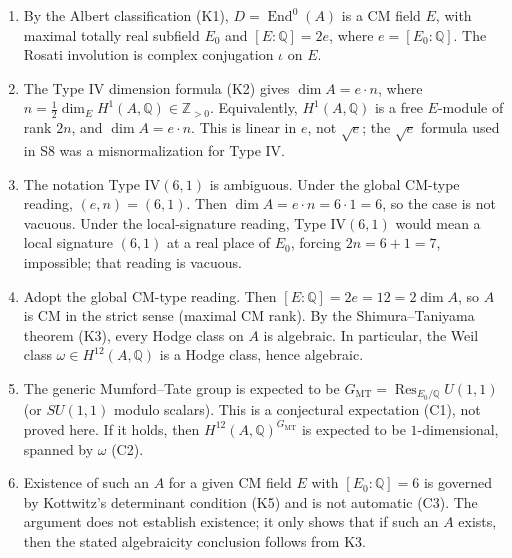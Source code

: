 \documentclass{article}
\begin{document}
\begin{enumerate}
\item By the Albert classification (K1), \(D = \operatorname{End}^0(A)\) is a CM field \(E\), with maximal totally real subfield \(E_0\) and \([E:\mathbb{Q}] = 2e\), where \(e = [E_0:\mathbb{Q}]\). The Rosati involution is complex conjugation \(\iota\) on \(E\).

\item The Type IV dimension formula (K2) gives \(\dim A = e\cdot n\), where
\(n = \tfrac12 \dim_E H^1(A,\mathbb{Q}) \in \mathbb{Z}_{>0}\). Equivalently, \(H^1(A,\mathbb{Q})\) is a free \(E\)-module of rank \(2n\), and \(\dim A = e\cdot n\). This is linear in \(e\), not \(\sqrt{e}\); the \(\sqrt{e}\) formula used in S8 was a misnormalization for Type IV.

\item The notation Type IV\((6,1)\) is ambiguous. Under the global CM-type reading, \((e,n) = (6,1)\). Then \(\dim A = e\cdot n = 6\cdot 1 = 6\), so the case is not vacuous. Under the local-signature reading, Type IV\((6,1)\) would mean a local signature \((6,1)\) at a real place of \(E_0\), forcing \(2n = 6+1 = 7\), impossible; that reading is vacuous.

\item Adopt the global CM-type reading. Then \([E:\mathbb{Q}] = 2e = 12 = 2\dim A\), so \(A\) is CM in the strict sense (maximal CM rank). By the Shimura--Taniyama theorem (K3), every Hodge class on \(A\) is algebraic. In particular, the Weil class \(\omega \in H^{12}(A,\mathbb{Q})\) is a Hodge class, hence algebraic.

\item The generic Mumford--Tate group is expected to be
\(G_{\mathrm{MT}} = \operatorname{Res}_{E_0/\mathbb{Q}} U(1,1)\) (or \(SU(1,1)\) modulo scalars). This is a conjectural expectation (C1), not proved here. If it holds, then \(H^{12}(A,\mathbb{Q})^{G_{\mathrm{MT}}}\) is expected to be \(1\)-dimensional, spanned by \(\omega\) (C2).

\item Existence of such an \(A\) for a given CM field \(E\) with \([E_0:\mathbb{Q}] = 6\) is governed by Kottwitz's determinant condition (K5) and is not automatic (C3). The argument does not establish existence; it only shows that if such an \(A\) exists, then the stated algebraicity conclusion follows from K3.
\end{enumerate}
\end{document}
